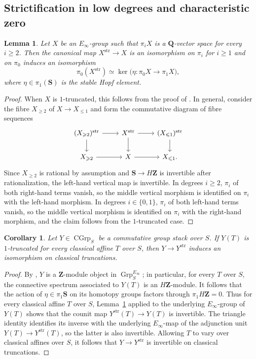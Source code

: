 \documentclass[12pt, oneside]{amsart}
\numberwithin{equation}{section}
\newtheorem{corollary}[subsubsection]{Corollary}
\newtheorem{lemma}[subsubsection]{Lemma}
\theoremstyle{remark}
\theoremstyle{plain}
\renewcommand{\geq}{\geqslant}
\renewcommand{\leq}{\leqslant}
\newcommand{\bZ}{\mathbf{Z}}
\newcommand{\bQ}{\mathbf{Q}}
\newcommand{\CGrp}{\operatorname{CGrp}}
\newcommand{\GrpEoo}{\operatorname{Grp}^{E_\infty}}
\begin{document}
\subsection{Strictification in low degrees and characteristic zero}

\begin{lemma}\label{lem:strictification stable defect}
Let $X$ be an $E_\infty$-group such that $\pi_iX$ is a $\bQ$-vector space for every $i\geq2$.
Then the canonical map $X^{\mathrm{str}} \to X$ is an isomorphism on $\pi_i$ for $i\geq 1$ and on $\pi_0$ induces an isomorphism
\[
  \pi_0(X^{\mathrm{str}}) \simeq \ker\bigl(\eta:\pi_0X\to\pi_1X\bigr),
\]
where $\eta\in\pi_1(\mathbf{S})$ is the stable Hopf element.
\end{lemma}

\begin{proof}
When $X$ is $1$-truncated, this follows from the proof of \cite[Prop.~3.8]{CarmeliStrictPicard}.
In general, consider the fibre $X_{\geq2}$ of $X\to X_{\leq1}$ and form the commutative diagram of fibre sequences
\[
  \begin{tikzcd}
    (X_{\geq2})^{\mathrm{str}} \ar[r] \ar[d] & X^{\mathrm{str}} \ar[r] \ar[d] & (X_{\leq1})^{\mathrm{str}} \ar[d] \\
    X_{\geq2} \ar[r] & X \ar[r] & X_{\leq1}.
  \end{tikzcd}
\]
Since $X_{\geq 2}$ is rational by assumption and $\mathbf S\to H\bZ$ is invertible after rationalization, the left-hand vertical map is invertible.
In degrees $i\geq2$, $\pi_i$ of both right-hand terms vanish, so the middle vertical morphism is identified on $\pi_i$ with the left-hand morphism.
In degrees $i \in \{0,1\}$, $\pi_i$ of both left-hand terms vanish, so the middle vertical morphism is identified on $\pi_i$ with the right-hand morphism, and the claim follows from the $1$-truncated case.
\end{proof}

\begin{corollary}\label{cor:strictification classical strict source}
Let $Y\in\CGrp_S$ be a commutative group stack over $S$.
If $Y(T)$ is $1$-truncated for every classical affine $T$ over $S$, then $Y\to Y^{\mathrm{str}}$ induces an isomorphism on classical truncations.
\end{corollary}

\begin{proof}
By \cite[Ex.~1.2.14]{LurieEll1}, $Y$ is a $\bZ$-module object in $\GrpEoo_S$; in particular, for every $T$ over $S$, the connective spectrum associated to $Y(T)$ is an $H\bZ$-module.
It follows that the action of $\eta\in\pi_1\mathbf S$ on its homotopy groups factors through $\pi_1H\bZ=0$.
Thus for every classical affine $T$ over $S$, Lemma~\ref{lem:strictification stable defect} applied to the underlying $E_\infty$-group of $Y(T)$ shows that the counit map $Y^{\mathrm{str}}(T) \to Y(T)$ is invertible.
The triangle identity identifies its inverse with the underlying $E_\infty$-map of the adjunction unit $Y(T)\to Y^{\mathrm{str}}(T)$, so the latter is also invertible.
Allowing $T$ to vary over classical affines over $S$, it follows that $Y \to Y^{\mathrm{str}}$ is invertible on classical truncations.
\end{proof}
\end{document}
